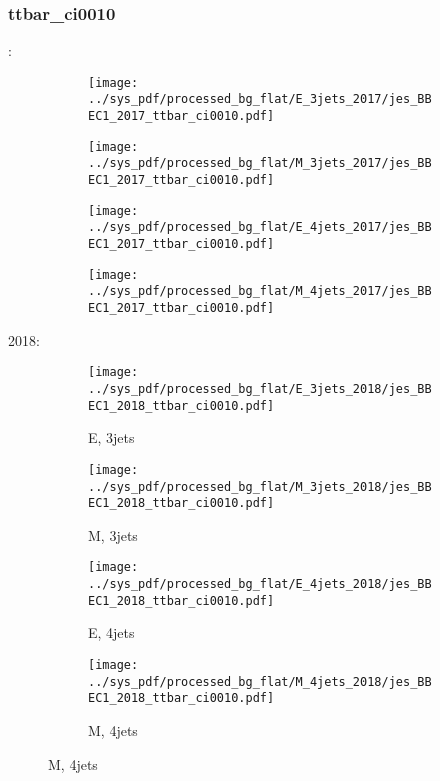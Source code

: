 \documentclass{beamer}
\begin{document}
\begin{frame}
\frametitle{ttbar_ci0010}
\fontsize{5}{1}:
\begin{figure}
\centering
\begin{subfigure}[b]{0.24\textwidth}
\texttt{[image: ../sys\_pdf/processed\_bg\_flat/E\_3jets\_2017/jes\_BBEC1\_2017\_ttbar\_ci0010.pdf]}
\end{subfigure}
\begin{subfigure}[b]{0.24\textwidth}
\texttt{[image: ../sys\_pdf/processed\_bg\_flat/M\_3jets\_2017/jes\_BBEC1\_2017\_ttbar\_ci0010.pdf]}
\end{subfigure}
\begin{subfigure}[b]{0.24\textwidth}
\texttt{[image: ../sys\_pdf/processed\_bg\_flat/E\_4jets\_2017/jes\_BBEC1\_2017\_ttbar\_ci0010.pdf]}
\end{subfigure}
\begin{subfigure}[b]{0.24\textwidth}
\texttt{[image: ../sys\_pdf/processed\_bg\_flat/M\_4jets\_2017/jes\_BBEC1\_2017\_ttbar\_ci0010.pdf]}
\end{subfigure}
\end{figure}
2018:
\begin{figure}
\centering
\begin{subfigure}[b]{0.24\textwidth}
\texttt{[image: ../sys\_pdf/processed\_bg\_flat/E\_3jets\_2018/jes\_BBEC1\_2018\_ttbar\_ci0010.pdf]}
\captionsetup{font=tiny}
\caption{E, 3jets}
\end{subfigure}
\begin{subfigure}[b]{0.24\textwidth}
\texttt{[image: ../sys\_pdf/processed\_bg\_flat/M\_3jets\_2018/jes\_BBEC1\_2018\_ttbar\_ci0010.pdf]}
\captionsetup{font=tiny}
\caption{M, 3jets}
\end{subfigure}
\begin{subfigure}[b]{0.24\textwidth}
\texttt{[image: ../sys\_pdf/processed\_bg\_flat/E\_4jets\_2018/jes\_BBEC1\_2018\_ttbar\_ci0010.pdf]}
\captionsetup{font=tiny}
\caption{E, 4jets}
\end{subfigure}
\begin{subfigure}[b]{0.24\textwidth}
\texttt{[image: ../sys\_pdf/processed\_bg\_flat/M\_4jets\_2018/jes\_BBEC1\_2018\_ttbar\_ci0010.pdf]}
\captionsetup{font=tiny}
\caption{M, 4jets}
\end{subfigure}
\end{figure}
\end{frame}
\end{document}
